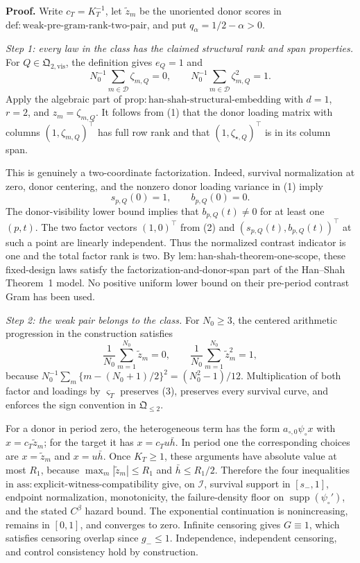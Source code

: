 \textbf{Proof.}
Write \(c_T=K_T^{-1}\), let \(\widetilde z_m\) be the unoriented donor
scores in
\(\mathrm{def:weak\mbox{-}pre\mbox{-}gram\mbox{-}rank\mbox{-}two\mbox{-}pair}\),
and put \(q_\alpha=1/2-\alpha>0\).

\emph{Step 1: every law in the class has the claimed structural rank and
span properties.}
For \(Q\in\mathfrak Q_{2,\mathrm{vis}}\), the definition gives
\(e_Q=1\) and
\[
 N_0^{-1}\sum_{m\in\mathcal D}\zeta_{m,Q}=0,
 \qquad
 N_0^{-1}\sum_{m\in\mathcal D}\zeta_{m,Q}^2=1.       \tag{1}
\]
Apply the algebraic part of
\(\mathrm{prop:han\mbox{-}shah\mbox{-}structural\mbox{-}embedding}\)
with \(d=1\), \(r=2\), and \(z_m=\zeta_{m,Q}\).  It follows from (1)
that the donor loading matrix with columns \((1,\zeta_{m,Q})^\top\) has
full row rank and that \((1,\zeta_{\star,Q})^\top\) is in its column
span.

This is genuinely a two-coordinate factorization.  Indeed, survival
normalization at zero, donor centering, and the nonzero donor loading
variance in (1) imply
\[
 s_{p,Q}(0)=1,
 \qquad b_{p,Q}(0)=0.                                  \tag{2}
\]
The donor-visibility lower bound implies that \(b_{p,Q}(t)\ne0\) for at
least one \((p,t)\).  The two factor vectors \((1,0)^\top\) from (2) and
\((s_{p,Q}(t),b_{p,Q}(t))^\top\) at such a point are linearly
independent.  Thus the normalized contrast indicator is one and the total
factor rank is two.  By
\(\mathrm{lem:han\mbox{-}shah\mbox{-}theorem\mbox{-}one\mbox{-}scope}\),
these fixed-design laws satisfy the factorization-and-donor-span part of
the Han--Shah Theorem~1 model.  No positive uniform lower bound on their
pre-period contrast Gram has been used.

\emph{Step 2: the weak pair belongs to the class.}
For \(N_0\ge3\), the centered arithmetic progression in the construction
satisfies
\[
 \frac1{N_0}\sum_{m=1}^{N_0}\widetilde z_m=0,
 \qquad
 \frac1{N_0}\sum_{m=1}^{N_0}\widetilde z_m^2=1,       \tag{3}
\]
because
\(N_0^{-1}\sum_m\{m-(N_0+1)/2\}^2=(N_0^2-1)/12\).
Multiplication of both factor and loadings by \(\varsigma_T\) preserves
(3), preserves every survival curve, and enforces the sign convention in
\(\mathfrak Q_{\leq2}\).

For a donor in period zero, the heterogeneous term has the form
\(a_{\circ,0}\psi_\circ x\) with
\(x=c_T\widetilde z_m\); for the target it has
\(x=c_Tu\bar h\).  In period one the corresponding choices are
\(x=\widetilde z_m\) and \(x=u\bar h\).  Once \(K_T\ge1\), these
arguments have absolute value at most \(R_1\), because
\(\max_m|\widetilde z_m|\le R_1\) and
\(\bar h\le R_1/2\).  Therefore the four inequalities in
\(\mathrm{ass:explicit\mbox{-}witness\mbox{-}compatibility}\) give, on
\(\mathcal I\), survival support in \([s_-,1]\), endpoint normalization,
monotonicity, the failure-density floor on
\(\operatorname{supp}(\psi_\circ')\), and the stated \(C^\beta\) hazard
bound.  The exponential continuation is nonincreasing, remains in
\([0,1]\), and converges to zero.  Infinite censoring gives \(G\equiv1\),
which satisfies censoring overlap since \(g_-\le1\).  Independence,
independent censoring, and control consistency hold by construction.


